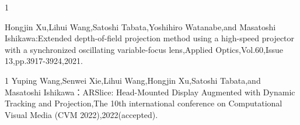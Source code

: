 \begin{雑誌論文}{1}

Hongjin Xu,Lihui Wang,Satoshi Tabata,Yoshihiro Watanabe,and Masatoshi Ishikawa:Extended depth-of-field projection method using a high-speed projector with a synchronized oscillating variable-focus lens,Applied Optics,Vol.60,Issue 13,pp.3917-3924,2021.

\end{雑誌論文}

\begin{査読付}{1}
Yuping Wang,Senwei Xie,Lihui Wang,Hongjin Xu,Satoshi Tabata,and Masatoshi Ishikawa：ARSlice: Head-Mounted Display Augmented with Dynamic Tracking and Projection,The 10th international conference on Computational Visual Media (CVM 2022),2022(accepted).

\end{査読付}
